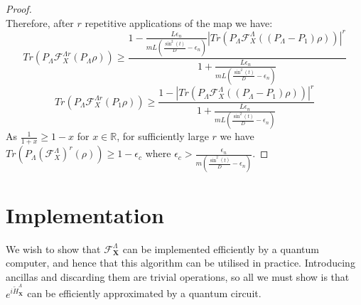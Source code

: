 \documentclass[10pt]{amsart}
\newcommand{\X}{\textbf{X}}
\begin{document}
\begin{proof}
\begin{equation}
\end{equation}
Therefore, after $r$ repetitive applications of the map we have:
\begin{equation}
    Tr(P_{\Lambda}\mathcal{F}^{\Lambda r}_X(P_{\Lambda}\rho)) \geq \frac{1-\frac{L\epsilon_n}{mL \left(\frac{\sin^2(t)}{D} - \epsilon_n\right)}|Tr(P_{\Lambda}\mathcal{F}^{\Lambda}_X((P_{\Lambda}-P_1)\rho))|^r}{1+\frac{L\epsilon_n}{mL \left(\frac{\sin^2(t)}{D} - \epsilon_n\right)}}
\end{equation}
\begin{equation}
    Tr(P_{\Lambda}\mathcal{F}^{\Lambda r}_X(P_1\rho)) \geq \frac{1-|Tr(P_{\Lambda}\mathcal{F}^{\Lambda}_X((P_{\Lambda}-P_1)\rho))|^r}{1+\frac{L\epsilon_n}{mL \left(\frac{\sin^2(t)}{D} - \epsilon_n\right)}}
\end{equation}
As $\frac{1}{1+x} \geq 1-x$ for $x\in \mathbb{R}$, for sufficiently large $r$ we have $Tr(P_{\Lambda}(\mathcal{F}^{\Lambda}_X)^r(\rho)) \geq 1 - \epsilon_c$ where $\epsilon_c>\frac{\epsilon_n}{m \left(\frac{\sin^2(t)}{D} - \epsilon_n\right)}$.
\end{proof}

\section{Implementation}

We wish to show that $\mathcal{F}^{\Lambda}_{\X}$ can be implemented efficiently by a quantum computer, and hence that this algorithm can be utilised in practice. Introducing ancillas and discarding them are trivial operations, so all we must show is that $e^{i\tilde{H}^{\Lambda}_{\X}}$ can be efficiently approximated by a quantum circuit.
\end{document}
